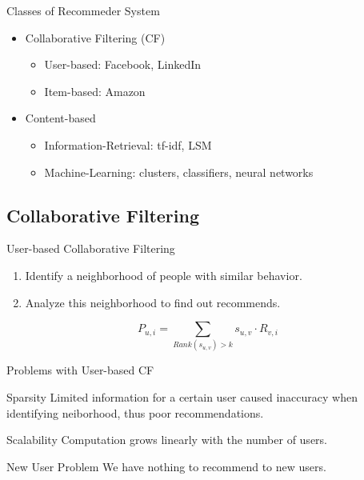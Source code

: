 \documentclass{beamer}
\begin{document}
\begin{frame}[fragile]{Classes of Recommeder System}
	\begin{itemize}
        \item Collaborative Filtering (CF)
        \begin{itemize}
        \item User-based: Facebook, LinkedIn
        \item Item-based: Amazon
        \end{itemize}

        \item Content-based
        \begin{itemize}
        \item Information-Retrieval: tf-idf, LSM
        \item Machine-Learning: clusters, classifiers, neural networks
        \end{itemize}
	\end{itemize}
\end{frame}

\subsection{Collaborative Filtering}

\begin{frame}[fragile]{User-based Collaborative Filtering}

\begin{enumerate}
\item Identify a neighborhood of people with similar behavior.
\item Analyze this neighborhood to find out recommends.
\end{enumerate}

\begin{equation}
P_{u,i} = \sum_{Rank(s_{u,v})>k}s_{u,v} \cdot R_{v,i}
\end{equation}

\end{frame}

\begin{frame}[fragile]{Problems with User-based CF}

\begin{block}{Sparsity}
        Limited information for a certain user caused inaccuracy when identifying neiborhood, thus poor recommendations.
        \end{block}
\begin{block}{Scalability}
        Computation grows linearly with the number of users.
        \end{block}

\begin{block}{New User Problem}
        We have nothing to recommend to new users.
        \end{block}

\end{frame}
\end{document}

